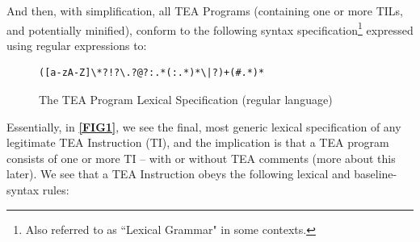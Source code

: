 \documentclass[a4paper, 18pt]{book} %
\begin{document}
    

And then, with simplification, all TEA Programs (containing one or more TILs, and potentially minified), conform to the following syntax specification\footnote{Also referred to as ``Lexical Grammar" in some contexts.} expressed using regular expressions to:


    
    \begin{figure}[H]
  \centering
  \begin{tcolorbox}[myterminalstyle, title=TEA Program (Regular Expression)]
  \begin{lstlisting}
([a-zA-Z]\*?!?\.?@?:.*(:.*)*\|?)+(#.*)*
  \end{lstlisting}
  \end{tcolorbox}
  \caption{The TEA Program Lexical Specification (regular language)}
  \label{FIG2}
\end{figure}


Essentially, in \textbf{\autoref{FIG1}}, we see the final, most generic lexical specification of any legitimate TEA Instruction (TI), and the implication is that a TEA program consists of one or more TI – with or without TEA comments (more about this later). We see that a TEA Instruction obeys the following lexical and baseline-syntax rules:
\end{document}
